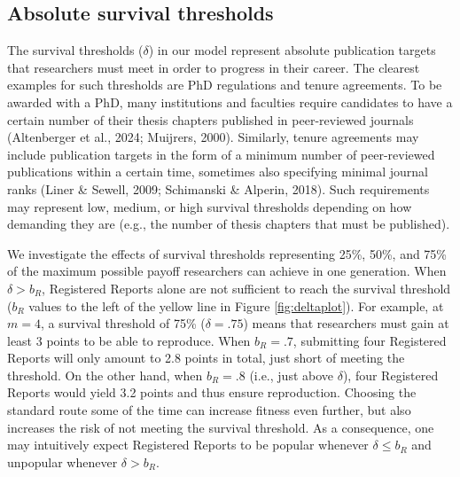 \documentclass[
  ,man,mask,floatsintext]{apa6}
\begin{document}
\hypertarget{absolute-survival-thresholds}{%
\subsection{Absolute survival thresholds}\label{absolute-survival-thresholds}}

The survival thresholds (\(\delta\)) in our model represent absolute publication targets that researchers must meet in order to progress in their career.
The clearest examples for such thresholds are PhD regulations and tenure agreements.
To be awarded with a PhD, many institutions and faculties require candidates to have a certain number of their thesis chapters published in peer-reviewed journals (Altenberger et al., 2024; Muijrers, 2000).
Similarly, tenure agreements may include publication targets in the form of a minimum number of peer-reviewed publications within a certain time, sometimes also specifying minimal journal ranks (Liner \& Sewell, 2009; Schimanski \& Alperin, 2018).
Such requirements may represent low, medium, or high survival thresholds depending on how demanding they are (e.g., the number of thesis chapters that must be published).

We investigate the effects of survival thresholds representing 25\%, 50\%, and 75\% of the maximum possible payoff researchers can achieve in one generation.
When \(\delta > b_{R}\), Registered Reports alone are not sufficient to reach the survival threshold (\(b_{R}\) values to the left of the yellow line in Figure \ref{fig:deltaplot}).
For example, at \(m = 4\), a survival threshold of 75\% (\(\delta = .75\)) means that researchers must gain at least 3 points to be able to reproduce.
When \(b_{R} = .7\), submitting four Registered Reports will only amount to 2.8 points in total, just short of meeting the threshold.
On the other hand, when \(b_{R} = .8\) (i.e., just above \(\delta\)), four Registered Reports would yield 3.2 points and thus ensure reproduction.
Choosing the standard route some of the time can increase fitness even further, but also increases the risk of not meeting the survival threshold.
As a consequence, one may intuitively expect Registered Reports to be popular whenever \(\delta \leq b_{R}\) and unpopular whenever \(\delta > b_{R}\).
\end{document}

